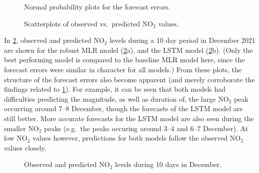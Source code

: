 \begin{figure}[h]
\centering
{}
\caption{Normal probability plots for the forecast errors.}
\label{fig:qq-plot-errors}
\vspace*{\floatsep}%
\caption{Scatterplots of observed vs.\ predicted NO$_2$ values.}
\label{fig:correlations}
\end{figure}
\clearpage

\noindent
In \cref{fig:pred_vs_obs}, observed and predicted NO$_2$ levels during a 10 day period in December 2021 are shown for the robust MLR model (\cref{fig:pred_vs_obs}a), and the LSTM model (\cref{fig:pred_vs_obs}b). (Only the best performing model is compared to the baseline MLR model here, since the forecast errors were similar in character for all models.) From these plots, the structure of the forecast errors also become apparent (and merely corroborate the findings related to \cref{fig:correlations}). For example, it can be seen that both models had difficulties predicting the magnitude, as well as duration of, the large NO$_2$ peak occurring around 7--8 December, though the forecasts of the LSTM model are still better. More accurate forecasts for the LSTM model are also seen during the smaller NO$_2$ peaks (e.g.\ the peaks occuring around 3--4 and 6--7 December). At low NO$_2$ values however, predictions for both models follow the observed NO$_2$ values closely. 


\begin{figure}[h] 
\begin{center}
\caption{Observed and predicted NO$_2$ levels during 10 days in December.}
\label{fig:pred_vs_obs}
\end{center}
\end{figure}

